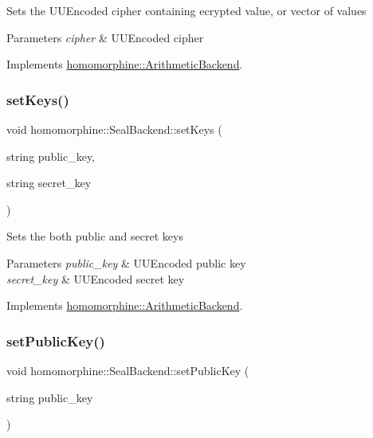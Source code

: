 Sets the U\+U\+Encoded cipher containing ecrypted value, or vector of values


\begin{DoxyParams}{Parameters}
{\em cipher} & U\+U\+Encoded cipher \\
\hline
\end{DoxyParams}


Implements \mbox{\hyperlink{classhomomorphine_1_1_arithmetic_backend_af9b2d3b33a03d79facdf113c9560fc0b}{homomorphine\+::\+Arithmetic\+Backend}}.

\mbox{\label{classhomomorphine_1_1_seal_backend_a42afcc2823d616edc6be0e3950cf7196}} 
\subsubsection{\texorpdfstring{setKeys()}{setKeys()}}
{\footnotesize\ttfamily void homomorphine\+::\+Seal\+Backend\+::set\+Keys (\begin{DoxyParamCaption}\item[{string}]{public\+\_\+key,  }\item[{string}]{secret\+\_\+key }\end{DoxyParamCaption})\hspace{0.3cm}{\ttfamily [virtual]}}

Sets the both public and secret keys


\begin{DoxyParams}{Parameters}
{\em public\+\_\+key} & U\+U\+Encoded public key \\
\hline
{\em secret\+\_\+key} & U\+U\+Encoded secret key \\
\hline
\end{DoxyParams}


Implements \mbox{\hyperlink{classhomomorphine_1_1_arithmetic_backend_ac78f4b42dce3dce23edd81dba60b16c8}{homomorphine\+::\+Arithmetic\+Backend}}.

\mbox{\label{classhomomorphine_1_1_seal_backend_a6d34008acb06ff1d6743f9163fcd41fb}} 
\subsubsection{\texorpdfstring{setPublicKey()}{setPublicKey()}}
{\footnotesize\ttfamily void homomorphine\+::\+Seal\+Backend\+::set\+Public\+Key (\begin{DoxyParamCaption}\item[{string}]{public\+\_\+key }\end{DoxyParamCaption})\hspace{0.3cm}{\ttfamily [virtual]}}

